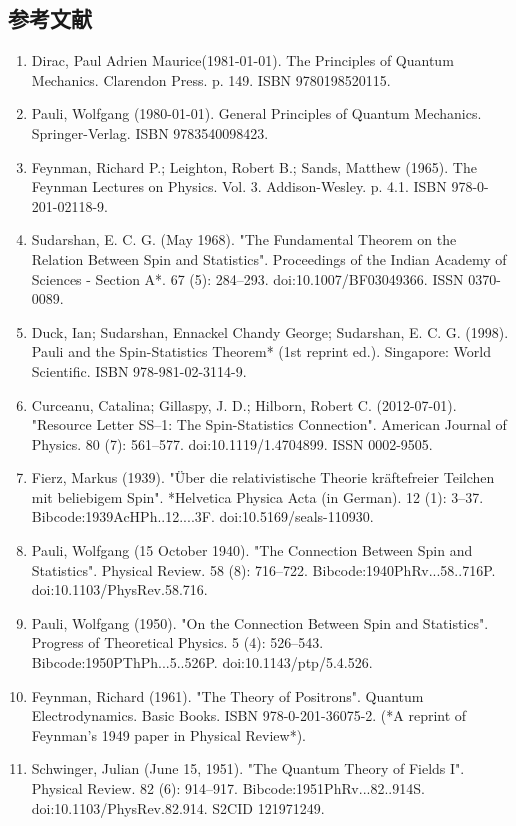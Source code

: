 \subsection{参考文献} 
\begin{enumerate}
\item Dirac, Paul Adrien Maurice(1981-01-01). The Principles of Quantum Mechanics. Clarendon Press. p. 149. ISBN 9780198520115.  
\item Pauli, Wolfgang (1980-01-01). General Principles of Quantum Mechanics. Springer-Verlag. ISBN 9783540098423.  
\item Feynman, Richard P.; Leighton, Robert B.; Sands, Matthew (1965). The Feynman Lectures on Physics. Vol. 3. Addison-Wesley. p. 4.1. ISBN 978-0-201-02118-9.  
\item Sudarshan, E. C. G. (May 1968). "The Fundamental Theorem on the Relation Between Spin and Statistics". Proceedings of the Indian Academy of Sciences - Section A*. 67 (5): 284–293. doi:10.1007/BF03049366. ISSN 0370-0089.  
\item Duck, Ian; Sudarshan, Ennackel Chandy George; Sudarshan, E. C. G. (1998). Pauli and the Spin-Statistics Theorem* (1st reprint ed.). Singapore: World Scientific. ISBN 978-981-02-3114-9.  
\item Curceanu, Catalina; Gillaspy, J. D.; Hilborn, Robert C. (2012-07-01). "Resource Letter SS–1: The Spin-Statistics Connection". American Journal of Physics. 80 (7): 561–577. doi:10.1119/1.4704899. ISSN 0002-9505.  
\item Fierz, Markus (1939). "Über die relativistische Theorie kräftefreier Teilchen mit beliebigem Spin". *Helvetica Physica Acta (in German). 12 (1): 3–37. Bibcode:1939AcHPh..12....3F. doi:10.5169/seals-110930.  
\item Pauli, Wolfgang (15 October 1940). "The Connection Between Spin and Statistics". Physical Review. 58 (8): 716–722. Bibcode:1940PhRv...58..716P. doi:10.1103/PhysRev.58.716.  
\item Pauli, Wolfgang (1950). "On the Connection Between Spin and Statistics". Progress of Theoretical Physics. 5 (4): 526–543. Bibcode:1950PThPh...5..526P. doi:10.1143/ptp/5.4.526.  
\item Feynman, Richard (1961). "The Theory of Positrons". Quantum Electrodynamics. Basic Books. ISBN 978-0-201-36075-2. (*A reprint of Feynman's 1949 paper in Physical Review*).
\item Schwinger, Julian (June 15, 1951). "The Quantum Theory of Fields I". Physical Review. 82 (6): 914–917. Bibcode:1951PhRv...82..914S. doi:10.1103/PhysRev.82.914. S2CID 121971249.  

\end{enumerate}
